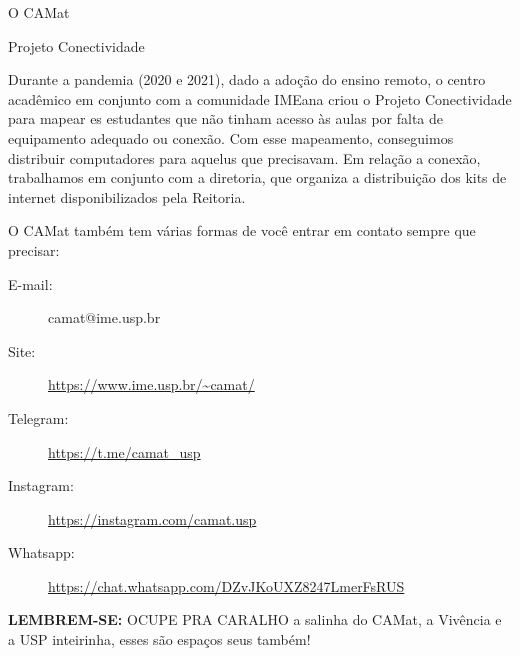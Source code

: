 \begin{secao}{O CAMat}
\begin{subsecao}{Projeto Conectividade}

Durante a pandemia (2020 e 2021), dado a adoção do ensino remoto, o centro acadêmico em conjunto 
com a comunidade IMEana criou o Projeto Conectividade para mapear es estudantes que não tinham acesso
às aulas por falta de equipamento adequado ou conexão. Com esse mapeamento, conseguimos distribuir 
computadores para aquelus que precisavam. Em relação a conexão, trabalhamos em conjunto com a diretoria, 
que organiza a distribuição dos kits de internet disponibilizados pela Reitoria.

\end{subsecao}

O CAMat também tem várias formas de você entrar em contato sempre que precisar:

\begin{description}
\item [E-mail:] camat@ime.usp.br
\item [Site:] \url{https://www.ime.usp.br/~camat/}
\item [Telegram:] \url{https://t.me/camat_usp}
\item [Instagram:] \url{https://instagram.com/camat.usp}
\item [Whatsapp:] \url{https://chat.whatsapp.com/DZvJKoUXZ8247LmerFsRUS}
\end{description}

\textbf{LEMBREM-SE:} OCUPE PRA CARALHO a salinha do CAMat, a Vivência e a USP inteirinha, esses são espaços seus também!


\end{secao}

